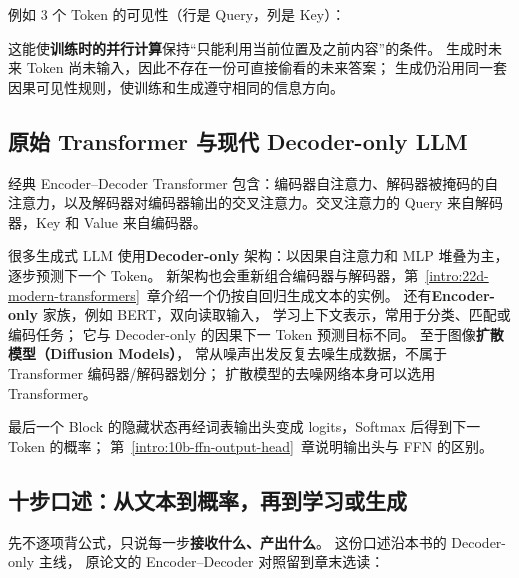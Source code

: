 例如 3 个 Token 的可见性（行是 Query，列是 Key）：



这能使\textbf{训练时的并行计算}保持“只能利用当前位置及之前内容”的条件。
生成时未来 Token 尚未输入，因此不存在一份可直接偷看的未来答案；
生成仍沿用同一套因果可见性规则，使训练和生成遵守相同的信息方向。

\subsection{原始 Transformer 与现代 Decoder-only LLM}
\label{concept:cross-attention}

经典 Encoder--Decoder Transformer 包含：编码器自注意力、解码器被掩码的自注意力，以及解码器对编码器输出的交叉注意力。交叉注意力的 Query 来自解码器，Key 和 Value 来自编码器。

很多生成式 LLM 使用\textbf{Decoder-only} 架构：以因果自注意力和 MLP 堆叠为主，逐步预测下一个 Token。
新架构也会重新组合编码器与解码器，第~\ref*{intro:22d-modern-transformers}~章介绍一个仍按自回归生成文本的实例。
还有\textbf{Encoder-only} 家族，例如 BERT，双向读取输入，
学习上下文表示，常用于分类、匹配或编码任务；
它与 Decoder-only 的因果下一 Token 预测目标不同。
至于图像\textbf{扩散模型（Diffusion Models）}，
常从噪声出发反复去噪生成数据，不属于 Transformer 编码器/解码器划分；
扩散模型的去噪网络本身可以选用 Transformer。

最后一个 Block 的隐藏状态再经词表输出头变成 logits，Softmax 后得到下一 Token 的概率；
第~\ref*{intro:10b-ffn-output-head}~章说明输出头与 FFN 的区别。

\subsection{十步口述：从文本到概率，再到学习或生成}
\label{sec:transformer-ten-steps}

先不逐项背公式，只说每一步\textbf{接收什么、产出什么}。
这份口述沿本书的 Decoder-only 主线，
原论文的 Encoder--Decoder 对照留到章末选读：

